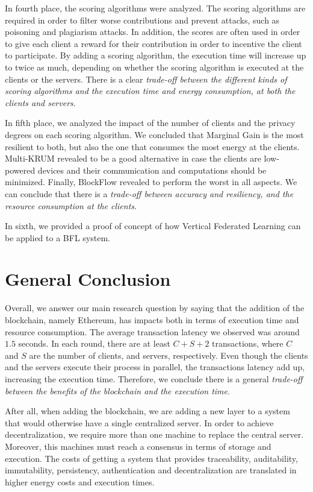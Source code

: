 In fourth place, the scoring algorithms were analyzed. The scoring algorithms are required in order to filter worse contributions and prevent attacks, such as poisoning and plagiarism attacks. In addition, the scores are often used in order to give each client a reward for their contribution in order to incentive the client to participate. By adding a scoring algorithm, the execution time will increase up to twice as much, depending on whether the scoring algorithm is executed at the clients or the servers. There is a clear \textit{trade-off between the different kinds of scoring algorithms and the execution time and energy consumption, at both the clients and servers}.

In fifth place, we analyzed the impact of the number of clients and the privacy degrees on each scoring algorithm. We concluded that Marginal Gain is the most resilient to both, but also the one that consumes the most energy at the clients. Multi-KRUM revealed to be a good alternative in case the clients are low-powered devices and their communication and computations should be minimized. Finally, BlockFlow revealed to perform the worst in all aspects. We can conclude that there is a \textit{trade-off between accuracy and resiliency, and the resource consumption at the clients}.

In sixth, we provided a proof of concept of how Vertical Federated Learning can be applied to a BFL system.

\section{General Conclusion}\label{conclusions:general}

Overall, we answer our main research question by saying that the addition of the blockchain, namely Ethereum, has impacts both in terms of execution time and resource consumption. The average transaction latency we observed was around $1.5$ seconds. In each round, there are at least $C+S+2$ transactions, where $C$ and $S$ are the number of clients, and servers, respectively. Even though the clients and the servers execute their process in parallel, the transactions latency add up, increasing the execution time. Therefore, we conclude there is a general \textit{trade-off between the benefits of the blockchain and the execution time}.

After all, when adding the blockchain, we are adding a new layer to a system that would otherwise have a single centralized server. In order to achieve decentralization, we require more than one machine to replace the central server. Moreover, this machines must reach a consensus in terms of storage and execution. The costs of getting a system that provides traceability, auditability, immutability, persistency, authentication and decentralization are translated in higher energy costs and execution times.


